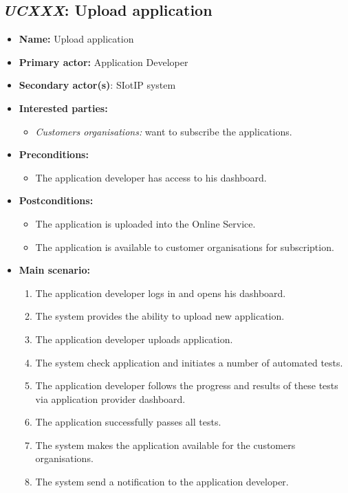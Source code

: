 \subsection{\emph{UCXXX}: Upload application}
\begin{itemize}
    \item \textbf{Name:} Upload application
    \item \textbf{Primary actor:} Application Developer
    \item \textbf{Secondary actor(s)}: SIotIP system
    \item \textbf{Interested parties:}
        \begin{itemize}
            \item \textit{Customers organisations:} want to subscribe the applications.
        \end{itemize}

    \item \textbf{Preconditions:}
        \begin{itemize}
            \item The application developer has access to his dashboard.
        \end{itemize}

    \item \textbf{Postconditions:}
        \begin{itemize}
            \item The application is uploaded into the Online Service.
            \item The application is available to customer organisations for subscription.
        \end{itemize}

    \item \textbf{Main scenario:}
    \begin{enumerate}
       \item The application developer logs in and opens his dashboard.
       \item The system provides the ability to upload new application.
       \item The application developer uploads application.
       \item The system check application and  initiates a number of automated tests.
       \item The application developer follows  the  progress  and  results  
             of these tests via application provider dashboard.
       \item The application successfully passes all tests.
       \item The system makes the application available for the customers organisations.
       \item The system send a notification to the application developer.
    \end{enumerate}


\end{itemize}
